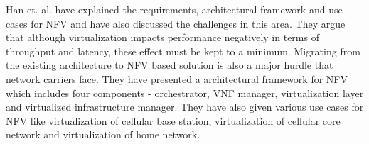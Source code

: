 Han et. al. \cite{han2015network} have  explained the requirements, architectural framework and use cases for NFV and have also discussed the challenges in this area. They argue that although virtualization impacts performance negatively in terms of throughput and latency, these effect must be kept to a minimum. Migrating from the existing architecture to NFV based solution is also a major hurdle that network carriers face. They have presented a architectural framework for NFV which includes four components - orchestrator, VNF manager, virtualization layer and virtualized infrastructure manager. They have also given various use cases for NFV like virtualization of cellular base station, virtualization of cellular core network and virtualization of home network.